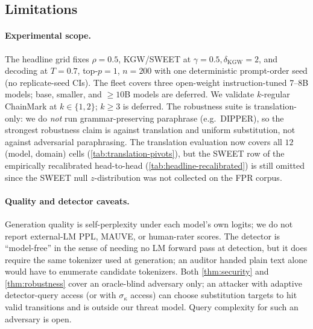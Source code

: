 \subsection{Limitations}

\paragraph{Experimental scope.} The headline grid fixes $\rho=0.5$,
KGW/SWEET at $\gamma{=}0.5,\delta_{\mathrm{KGW}}{=}2$, and decoding
at $T{=}0.7$, top-$p{=}1$, $n{=}200$ with one deterministic
prompt-order seed (no replicate-seed CIs). The fleet covers three
open-weight instruction-tuned 7--8B models; base, smaller, and
$\geq 10$B models are deferred. We validate $k$-regular ChainMark at
$k\in\{1,2\}$; $k\geq 3$ is deferred. The robustness suite is translation-only: we do
\emph{not} run grammar-preserving paraphrase (e.g.\ DIPPER), so the
strongest robustness claim is against translation and uniform
substitution, not against adversarial paraphrasing. The translation
evaluation now covers all $12$ (model, domain) cells
(\autoref{tab:translation-pivots}), but the SWEET row of the
empirically recalibrated head-to-head
(\autoref{tab:headline-recalibrated}) is still omitted since the
SWEET null $z$-distribution was not collected on the FPR corpus.

\paragraph{Quality and detector caveats.} Generation quality is
self-perplexity under each model's own logits; we do not report
external-LM PPL, MAUVE, or human-rater scores. The detector is
``model-free'' in the sense of needing no LM forward pass at
detection, but it does require the same tokenizer used at
generation; an auditor handed plain text alone would have to
enumerate candidate tokenizers. Both \autoref{thm:security} and \autoref{thm:robustness} cover an
oracle-blind adversary only; an attacker with adaptive
detector-query access (or with $\sigma_\kappa$ access) can choose
substitution targets to hit valid transitions and is outside our
threat model. Query complexity for such an adversary is open.

